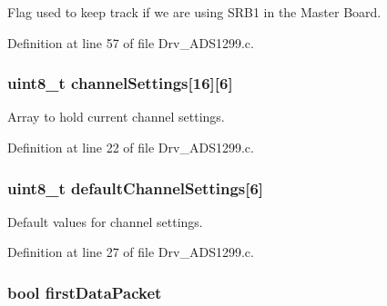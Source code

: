 Flag used to keep track if we are using S\+R\+B1 in the Master Board. 



Definition at line 57 of file Drv\+\_\+\+A\+D\+S1299.\+c.

\subsubsection[{\texorpdfstring{channel\+Settings}{channelSettings}}]{\setlength{\rightskip}{0pt plus 5cm}uint8\+\_\+t channel\+Settings\mbox{[}16\mbox{]}\mbox{[}6\mbox{]}}\hypertarget{group__ADS1299__Library_ga301925f8d0be3a235549a1d8a2775909}{}\label{group__ADS1299__Library_ga301925f8d0be3a235549a1d8a2775909}


Array to hold current channel settings. 



Definition at line 22 of file Drv\+\_\+\+A\+D\+S1299.\+c.

\subsubsection[{\texorpdfstring{default\+Channel\+Settings}{defaultChannelSettings}}]{\setlength{\rightskip}{0pt plus 5cm}uint8\+\_\+t default\+Channel\+Settings\mbox{[}6\mbox{]}}\hypertarget{group__ADS1299__Library_ga0ec603fb6c5e40febc9a5139ef12969b}{}\label{group__ADS1299__Library_ga0ec603fb6c5e40febc9a5139ef12969b}


Default values for channel settings. 



Definition at line 27 of file Drv\+\_\+\+A\+D\+S1299.\+c.

\subsubsection[{\texorpdfstring{first\+Data\+Packet}{firstDataPacket}}]{\setlength{\rightskip}{0pt plus 5cm}bool first\+Data\+Packet}\hypertarget{group__ADS1299__Library_gadc787c1c2290ed1c985a4dc4cde9f1a3}{}\label{group__ADS1299__Library_gadc787c1c2290ed1c985a4dc4cde9f1a3}


